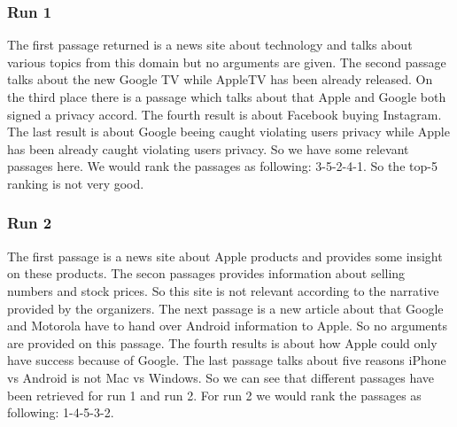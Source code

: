         \subsubsection*{Run 1}
            The first passage returned is a news site about technology and talks about various topics from this domain but no arguments are given. The second passage talks about the new Google TV while AppleTV has been already released. On the third place there is a passage which talks about that Apple and Google both signed a privacy accord. The fourth result is about Facebook buying Instagram. The last result is about Google beeing caught violating users privacy while Apple has been already caught violating users privacy. So we have some relevant passages here. We would rank the passages as following: 3-5-2-4-1. So the top-5 ranking is not very good. 
        \subsubsection*{Run 2}
            The first passage is a news site about Apple products and provides some insight on these products. The secon passages provides information about selling numbers and stock prices. So this site is not relevant according to the narrative provided by the organizers. The next passage is a new article about that Google and Motorola have to hand over Android information to Apple. So no arguments are provided on this passage. The fourth results is about how Apple could only have success because of Google.  The last passage talks about five reasons iPhone vs Android is not Mac vs Windows. So we can see that different passages have been retrieved for run 1 and run 2. For run 2 we would rank the passages as following: 1-4-5-3-2.